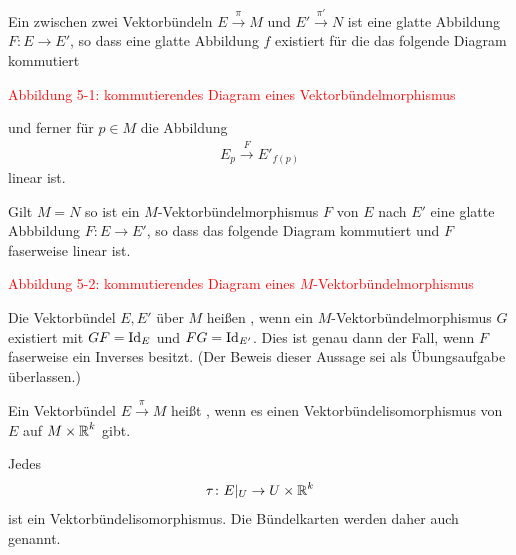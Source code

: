 Ein  zwischen zwei Vektorbündeln $E \xrightarrow{\pi} M$ und $E' \xrightarrow{\pi'} N$ ist eine glatte Abbildung $F \colon E \to E'$, so dass eine glatte Abbildung $f$ existiert für die das folgende Diagram kommutiert

\textcolor{red}{Abbildung 5-1: kommutierendes Diagram eines Vektorbündelmorphismus}

und ferner für $p \in M$ die Abbildung
\begin{align*}
  E_p \xrightarrow{F} E'_{f(p)}
\end{align*}
linear ist.

Gilt $M = N$ so ist ein $M$-Vektorbündelmorphismus $F$ von $E$ nach $E'$ eine glatte Abbbildung $F \colon E \to E'$, so dass das folgende Diagram kommutiert und $F$ faserweise linear ist.

\textcolor{red}{Abbildung 5-2: kommutierendes Diagram eines $M$-Vektorbündelmorphismus}

Die Vektorbündel $E,E'$ über $M$ heißen , wenn ein $M$-Vektorbündelmorphismus
$G$ existiert mit $G F = \operatorname{Id}_E$ und $FG = \operatorname{Id}_{E'}$.
Dies ist genau dann der Fall, wenn $F$ faserweise ein Inverses besitzt.
(Der Beweis dieser Aussage sei als Übungsaufgabe überlassen.)

Ein Vektorbündel $E \xrightarrow{\pi} M$ heißt , wenn es einen Vektorbündelisomorphismus von $E$ auf $M \times \operatorname{\mathbb{R}}^k$ gibt.

Jedes
\begin{align*}
  \tau \colon E|_U \to U \times \operatorname{\mathbb{R}}^k
\end{align*}
ist ein Vektorbündelisomorphismus.
Die Bündelkarten werden daher auch  genannt.

